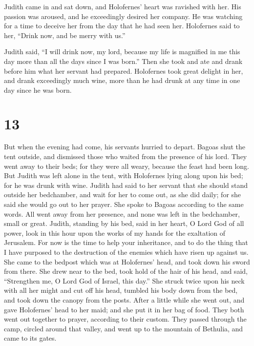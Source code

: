 Judith came in and sat down, and Holofernes' heart was
ravished with her. His passion was aroused, and he exceedingly desired
her company. He was watching for a time to deceive her from the day that
he had seen her.  Holofernes said to her, ``Drink now, and
be merry with us.''

 Judith said, ``I will drink now, my lord, because my life
is magnified in me this day more than all the days since I was born.''
 Then she took and ate and drank before him what her
servant had prepared.  Holofernes took great delight in
her, and drank exceedingly much wine, more than he had drunk at any time
in one day since he was born.

\hypertarget{section-12}{%
\section{13}\label{section-12}}

 But when the evening had come, his servants hurried to
depart. Bagoas shut the tent outside, and dismissed those who waited
from the presence of his lord. They went away to their beds; for they
were all weary, because the feast had been long.  But Judith
was left alone in the tent, with Holofernes lying along upon his bed;
for he was drunk with wine.  Judith had said to her servant
that she should stand outside her bedchamber, and wait for her to come
out, as she did daily; for she said she would go out to her prayer. She
spoke to Bagoas according to the same words.  All went away
from her presence, and none was left in the bedchamber, small or great.
Judith, standing by his bed, said in her heart, O Lord God of all power,
look in this hour upon the works of my hands for the exaltation of
Jerusalem.  For now is the time to help your inheritance,
and to do the thing that I have purposed to the destruction of the
enemies which have risen up against us.  She came to the
bedpost which was at Holofernes' head, and took down his sword from
there.  She drew near to the bed, took hold of the hair of
his head, and said, ``Strengthen me, O Lord God of Israel, this day.''
 She struck twice upon his neck with all her might and cut
off his head,  tumbled his body down from the bed, and took
down the canopy from the posts. After a little while she went out, and
gave Holofernes' head to her maid;  and she put it in her
bag of food. They both went out together to prayer, according to their
custom. They passed through the camp, circled around that valley, and
went up to the mountain of Bethulia, and came to its gates.

